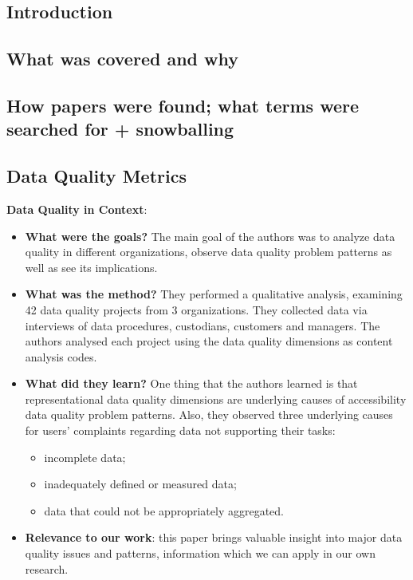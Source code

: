 \documentclass{mprop}
\begin{document}
\subsection{Introduction}

\subsection{What was covered and why}

\subsection{How papers were found; what terms were searched for + snowballing}

\subsection{Data Quality Metrics}

\textbf{Data Quality in Context}\cite{strong1997data}:
\begin{itemize}
  \item \textbf{What were the goals?}
    The main goal of the authors was to analyze data quality in different 
    organizations, observe data quality problem patterns as well as see 
    its implications.
  \item \textbf{What was the method?}
    They performed a qualitative analysis, examining 42 data quality projects 
    from 3 organizations. They collected data via interviews of data procedures,
    custodians, customers and managers. The authors analysed each project using
    the data quality dimensions as content analysis codes. 
  \item \textbf{What did they learn?}
    One thing that the authors learned is that representational data quality 
    dimensions are underlying causes of accessibility data quality problem 
    patterns. Also, they observed three underlying causes for users' complaints
    regarding data not supporting their tasks:
      \begin{itemize}
        \item incomplete data;
        \item inadequately defined or measured data;
        \item data that could not be appropriately aggregated.
      \end{itemize}
  \item \textbf{Relevance to our work}: this paper brings valuable insight into
    major data quality issues and patterns, information which we can apply in 
    our own research.
\end{itemize}
\end{document}
